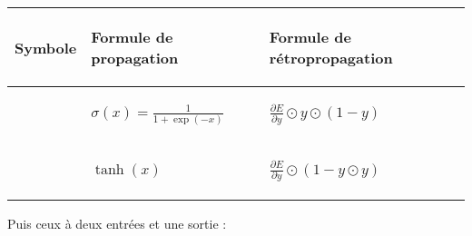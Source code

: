 \begin{center}
\begin{tabular}{|m{4cm}|m{}|m{}|}
\hline
\begin{center}Symbole\end{center} & \begin{center}Formule de propagation\end{center} & \begin{center}Formule de rétropropagation\end{center} \\
\hline
\begin{center}\end{center} & \begin{center}$\sigma(x) = \frac{1}{1 + \exp(-x)}$\end{center} & \begin{center}$\frac{\partial E}{\partial y} \odot y \odot (1 - y)$\end{center} \\
\hline
\begin{center}\end{center} & \begin{center}$\tanh(x)$\end{center} & \begin{center}$\frac{\partial E}{\partial y} \odot (1 - y \odot y)$\end{center} \\ 
\hline
\end{tabular}
\end{center}

Puis ceux à deux entrées et une sortie :


